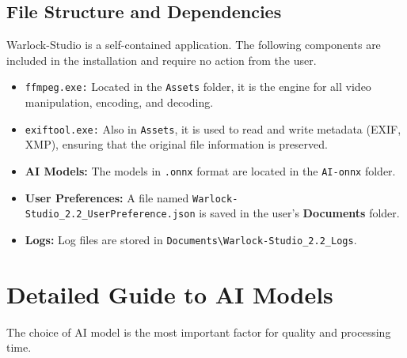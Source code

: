 \documentclass[11pt, a4paper]{article}
\newcommand{\inlinecode}[1]{\colorbox{WarlockLightGray}{\small\texttt{#1}}}
\begin{document}
\subsection{File Structure and Dependencies}
\begin{infobox}
Warlock-Studio is a self-contained application. The following components are included in the installation and require no action from the user.
\end{infobox}
\begin{itemize}[leftmargin=*]
    \item \inlinecode{ffmpeg.exe:} Located in the \texttt{Assets} folder, it is the engine for all video manipulation, encoding, and decoding.
    \item \inlinecode{exiftool.exe:} Also in \texttt{Assets}, it is used to read and write metadata (EXIF, XMP), ensuring that the original file information is preserved.
    \item \textbf{AI Models:} The models in \texttt{.onnx} format are located in the \texttt{AI-onnx} folder.
    \item \textbf{User Preferences:} A file named \inlinecode{Warlock-Studio_2.2_UserPreference.json} is saved in the user's \textbf{Documents} folder.
    \item \textbf{Logs:} Log files are stored in \texttt{Documents\textbackslash Warlock-Studio_2.2_Logs}.
\end{itemize}


\section{Detailed Guide to AI Models}
The choice of AI model is the most important factor for quality and processing time.
\end{document}
